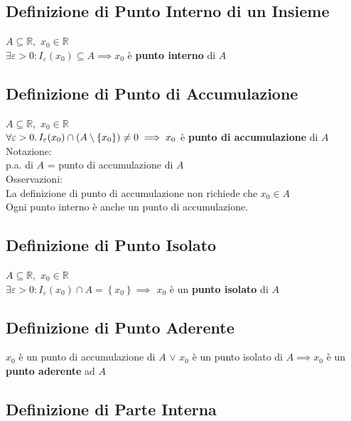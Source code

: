 \documentclass[a4paper, twoside, italian, 11pt]{book}
\newcommand{\braces}[1] {\left \{ #1 \right \}}
\newcommand{\R}{\mathbb{R}}
\begin{document}
\subsection{Definizione di Punto Interno di un Insieme}

\noindent
$A \subseteq \R,$ $x_0 \in \R$ \\

$\exists \varepsilon > 0 : I_\varepsilon(x_0) \subseteq A \implies x_0$ è \textbf{punto interno} di $A$


\subsection{Definizione di Punto di Accumulazione}

\noindent
$A \subseteq \R,$ $x_0 \in \R$ \\

$\forall \varepsilon > 0 \ldotp I_\varepsilon(x_0) \cap (A \setminus \braces{x_0}) \neq 0 \implies x_0$ è \textbf{punto di accumulazione} di $A$ \\

\noindent
Notazione: \\
p.a. di $A$ = punto di accumulazione di $A$ \\

\noindent
Osservazioni: \\
La definizione di punto di accumulazione non richiede che $x_0 \in A$ \\
Ogni punto interno è anche un punto di accumulazione.


\subsection{Definizione di Punto Isolato}

\noindent
$A \subseteq \R,$ $x_0 \in \R$ \\

$\exists \varepsilon > 0 : I_\varepsilon(x_0) \cap A = \braces{x_0} \implies$ $x_0$ è un \textbf{punto isolato} di $A$


\subsection{Definizione di Punto Aderente}

\noindent
$x_0$ è un punto di accumulazione di $A$ $\lor$ $x_0$ è un punto isolato di $A \implies x_0$ è un \textbf{punto aderente} ad $A$


\subsection{Definizione di Parte Interna}
\end{document}
